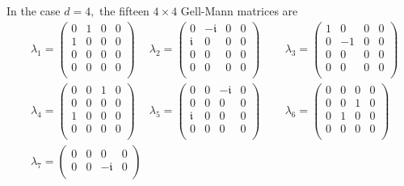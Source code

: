 \documentclass[12pt,dvipsnames,accepted=2016-08-18,a4paper,onecolumn]{quantumarticle}
\numberwithin{equation}{section}
\theoremstyle{definition}
\begin{document}
In the case $d=4,$ the fifteen $4 \times 4$ Gell-Mann matrices are
\begin{align*}
	&\lambda_1 = 
	\begin{pmatrix}
		0 & 1 & 0 & 0 \\
		1 & 0 & 0 & 0 \\
		0 & 0 & 0 & 0 \\
		0 & 0 & 0 & 0 \\
	\end{pmatrix}\quad \ 
	\lambda_2=
	\begin{pmatrix}
		0 & -\mathfrak{i} & 0 & 0 \\
		\mathfrak{i} & 0 & 0 & 0 \\
		0 & 0 & 0 & 0 \\
		0 & 0 & 0 & 0 \\
	\end{pmatrix}\quad \quad \,
	\lambda_3=
	\begin{pmatrix}
		1 & 0 & 0 & 0 \\
		0 & -1 & 0 & 0 \\
		0 & 0 & 0 & 0 \\
		0 & 0 & 0 & 0 \\
	\end{pmatrix}\\
	&\lambda_4=
	\begin{pmatrix}
		0 & 0 & 1 & 0 \\
		0 & 0 & 0 & 0 \\
		1 & 0 & 0 & 0 \\
		0 & 0 & 0 & 0 \\
	\end{pmatrix}\quad \ 
	\lambda_5=
	\begin{pmatrix}
		0 & 0 & -\mathfrak{i} & 0 \\
		0 & 0 & 0 & 0 \\
		\mathfrak{i} & 0 & 0 & 0 \\
		0 & 0 & 0 & 0 \\
	\end{pmatrix}\quad \quad \,
	\lambda_6=
	\begin{pmatrix}
		0 & 0 & 0 & 0 \\
		0 & 0 & 1 & 0 \\
		0 & 1 & 0 & 0 \\
		0 & 0 & 0 & 0 \\
	\end{pmatrix}\\
	&\lambda_7=
	\begin{pmatrix}
		0 & 0 & 0 & 0 \\
		0 & 0 & -\mathfrak{i} & 0 \\

\end{pmatrix}
\end{align*}
\end{document}
